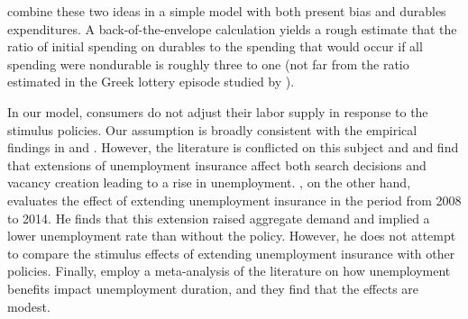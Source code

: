 \documentclass[\econtexRoot/HAFiscal]{subfiles}
\begin{document}
\cite{laibson2022simple} combine these two ideas in a simple model with both present bias and durables expenditures.  A back-of-the-envelope calculation yields a rough estimate that the ratio of initial spending on durables to the spending that would occur if all spending were nondurable is roughly three to one (not far from the ratio estimated in the Greek lottery episode studied by \cite{kotsogiannisMPCs}).

In our model, consumers do not adjust their labor supply in response to the stimulus policies.  Our assumption is broadly consistent with the empirical findings in \cite{ganong2022spending} and \cite{chodorow2016limited}. However, the literature is conflicted on this subject and \cite{hagedorn2017impact} and \cite{hagedorn2019unemployment} find that extensions of unemployment insurance affect both search decisions and vacancy creation leading to a rise in unemployment. \cite{kekre2022unemp}, on the other hand, evaluates the effect of extending unemployment insurance in the period from 2008 to 2014. He finds that this extension raised aggregate demand and implied a lower unemployment rate than without the policy. However, he does not attempt to compare the stimulus effects of extending unemployment insurance with other policies. Finally, \cite{cohenDisemployment} employ a meta-analysis of the literature on how unemployment benefits impact unemployment duration, and they find that the effects are modest. 
\end{document}
